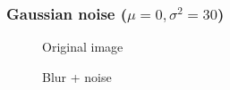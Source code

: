 \pagebreak
\subsubsection{Gaussian noise ($\mu = 0, \sigma^2 = 30$)}

\begin{figure}[!htb]\centering
    \begin{minipage}{0.45\textwidth}
        \caption{\small{Original image}}
    \end{minipage}
    \begin{minipage}{0.45\textwidth}
        \caption{\small{Blur + noise}}
    \end{minipage}
\end{figure}

